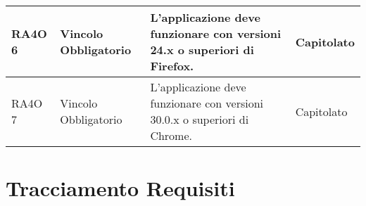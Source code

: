 \begin{center}
\begin{longtable}{ | l | p{2cm} | p{5cm} | p{1.7cm} |}
        RA4O 6 & Vincolo \newline  Obbligatorio  & L’applicazione deve funzionare con versioni 24.x o superiori di Firefox. &  Capitolato \newline  \\ \hline      
        RA4O 7 & Vincolo \newline  Obbligatorio  & L’applicazione deve funzionare con versioni 30.0.x o superiori di Chrome. &  Capitolato \newline  \\ \hline
      \end{longtable}
      \egroup
      \end{center}  
\clearpage
\section{Tracciamento Requisiti}
